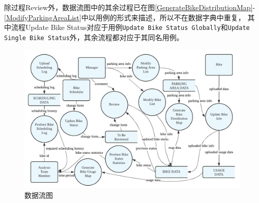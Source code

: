除过程Review外，数据流图中的其余过程已在图\ref{GenerateBikeDistributionMap}-\ref{ModifyParkingAreaList}中以用例的形式来描述，所以不在数据字典中重复，
其中流程Update Bike Status对应于用例\texttt{Update Bike Status Globally}和\texttt{Update Single Bike Status}外，其余流程都对应于其同名用例。

\begin{figure}[!htbp]
    \centering
    \includegraphics[width=\textwidth]{figures/DataFlow.pdf}
    \caption{数据流图}\label{DataFlow}
\end{figure}
